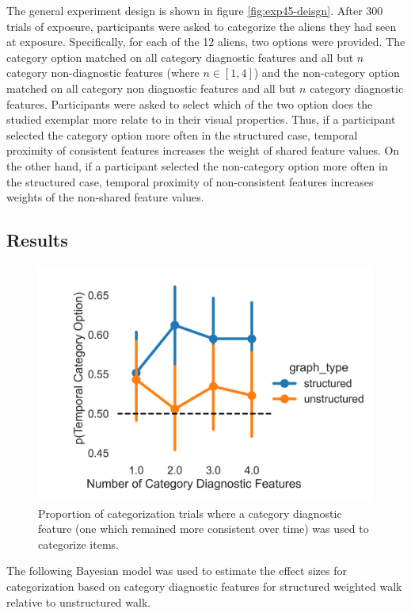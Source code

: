 The general experiment design is shown in figure \ref{fig:exp45-deisgn}. After 300 trials of exposure, participants were asked to categorize the aliens they had seen at exposure. Specifically, for each of the 12 aliens, two options were provided. The category option matched on all category diagnostic features and all but $n$ category non-diagnostic features (where $n \in [1,4]$) and the non-category option matched on all category non diagnostic features and all but $n$ category diagnostic features. Participants were asked to select which of the two option does the studied exemplar more relate to in their visual properties. Thus, if a participant selected the category option more often in the structured case, temporal proximity of consistent features increases the weight of shared feature values. On the other hand, if a participant selected the non-category option more often in the structured case, temporal proximity of non-consistent features increases weights of the non-shared feature values.

\subsection{Results}

\begin{figure}[h]
    \centering
    \includegraphics[width = \textwidth]{chapter_notebooks/chapter_4/figures/exp4_proportion_results.png}
    \caption{Proportion of categorization trials where a category diagnostic feature (one which remained more consistent over time) was used to categorize items.}
    \label{fig:exp4a-choice-accuracy}
\end{figure}
The following Bayesian model was used to estimate the effect sizes for categorization based on category diagnostic features for structured weighted walk relative to unstructured walk. 

